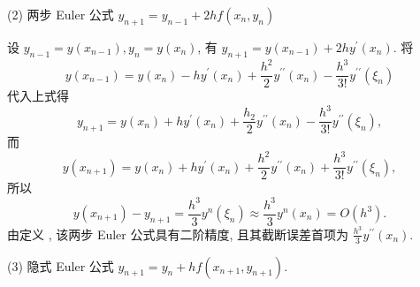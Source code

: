 (2) 两步 Euler 公式 $y_{n+1}=y_{n-1}+2 h f\left(x_{n}, y_{n}\right)$

设 $ y_{n-1}=y\left(x_{n-1}\right), y_{n}=y\left(x_{n}\right) $, 有 $ y_{n+1}=y\left(x_{n-1}\right)+2 h y^{\prime}\left(x_{n}\right) $.
将
$$
y\left(x_{n-1}\right)=y\left(x_{n}\right)-h y^{\prime}\left(x_{n}\right)+\frac{h^{2}}{2} y^{\prime \prime}\left(x_{n}\right)-\frac{h^{3}}{3!} y^{\prime \prime}\left(\xi_{n}\right)
$$
代入上式得
$$
y_{n+1}=y\left(x_{n}\right)+h y^{\prime}\left(x_{n}\right)+\frac{h_{2}}{2} y^{\prime \prime}\left(x_{n}\right)-\frac{h^{3}}{3!} y^{\prime \prime}\left(\xi_{n}\right),
$$
而
$$
y\left(x_{n+1}\right)=y\left(x_{n}\right)+h y^{\prime}\left(x_{n}\right)+\frac{h^{2}}{2} y^{\prime \prime}\left(x_{n}\right)+\frac{h^{3}}{3!} y^{\prime \prime}\left(\xi_{n}\right),
$$
所以
$$
y\left(x_{n+1}\right)-y_{n+1}=\frac{h^{3}}{3} y^{n}\left(\xi_{n}\right) \approx \frac{h^{3}}{3} y^{n}\left(x_{n}\right)=O\left(h^{3}\right) .
$$
由定义 , 该两步 Euler 公式具有二阶精度, 且其截断误差首项为 $ \frac{h^{3}}{3} y^{\prime \prime}\left(x_{n}\right) $.

(3) 隐式 Euler 公式 $y_{n+1}=y_{n}+h f\left(x_{n+1}, y_{n+1}\right) .$

